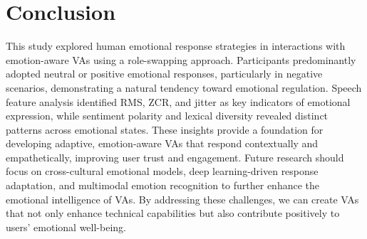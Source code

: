 \section{Conclusion}

This study explored human emotional response strategies in interactions with emotion-aware VAs using a role-swapping approach. Participants predominantly adopted neutral or positive emotional responses, particularly in negative scenarios, demonstrating a natural tendency toward emotional regulation. Speech feature analysis identified RMS, ZCR, and jitter as key indicators of emotional expression, while sentiment polarity and lexical diversity revealed distinct patterns across emotional states. These insights provide a foundation for developing adaptive, emotion-aware VAs that respond contextually and empathetically, improving user trust and engagement. Future research should focus on cross-cultural emotional models, deep learning-driven response adaptation, and multimodal emotion recognition to further enhance the emotional intelligence of VAs. By addressing these challenges, we can create VAs that not only enhance technical capabilities but also contribute positively to users' emotional well-being.
